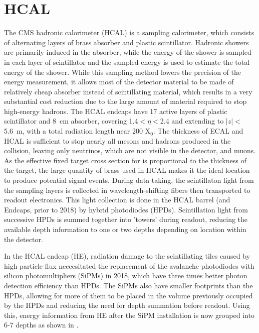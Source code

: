 \section{HCAL}
The CMS hadronic calorimeter (HCAL) is a sampling calorimeter, which consists of alternating layers of brass absorber and plastic scintillator. 
Hadronic showers are primarily induced in the absorber, while the energy of the shower is sampled in each layer of scintillator and the sampled energy is used to estimate the total energy of the shower. 
While this sampling method lowers the precision of the energy measurement, it allows most of the detector material to be made of relatively cheap absorber instead of scintillating material, which results in a very substantial cost reduction due to the large amount of material required to stop high-energy hadrons.
The HCAL endcaps have 17 active layers of plastic scintillator and \SI{8}{\centi\meter} absorber, covering 1.4$<\eta<$2.4 and extending to $\lvert z \rvert<$ \SI{5.6}{\meter}, with a total radiation length near 200 X$_0$. 
The thickness of ECAL and HCAL is sufficient to stop nearly all mesons and hadrons produced in the collision, leaving only neutrinos, which are not visible in the detector, and muons. 
As the effective fixed target cross section for \dbrem is proportional to the thickness of the target, the large quantity of brass used in HCAL makes it the ideal location to produce potential signal events.
During data taking, the scintillaton light from the sampling layers is collected in wavelength-shifting fibers then transported to readout electronics.
This light collection is done in the HCAL barrel (and Endcaps, prior to 2018) by hybrid photodiodes (HPDs). 
Scintillation light from successive HPDs is summed together into 'towers' during readout, reducing the available depth information to one or two depths depending on location within the detector.

In the HCAL endcap (HE), radiation damage to the scintillating tiles caused by high particle flux neccesitated the replacement of the avalanche photodiodes with silicon photomultipliers (SiPMs) in 2018, which have three times better photon detection efficiency than HPDs.  
The SiPMs also have smaller footprints than the HPDs, allowing for more of them to be placed in the volume previously occupied by the HPDs and reducing the need for depth summation before readout. 
Using this, energy information from HE after the SiPM installation is now grouped into 6-7 depths as shown in .


